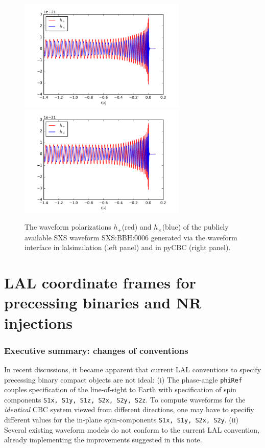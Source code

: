 \documentclass[11pt,tightenlines,article,amssymb,amsmath,amsfonts,superscriptaddress]{revtex4}
\begin{document}
\begin{figure}
\begin{center}
\includegraphics[width=80mm]{lalsim_SXS6.pdf}
\includegraphics[width=80mm]{pycbc_SXS6.pdf}
\caption{The waveform polarizations $h_+$(red) and $h_\times$(blue) of the publicly available SXS waveform SXS:BBH:0006
generated via the waveform interface in lalsimulation (left panel) and in pyCBC (right panel). }
\label{fig:waveforms}
\end{center}
\end{figure}

\section{LAL coordinate frames for precessing binaries and NR injections}
\label{sec:coordinates}

\subsubsection{Executive summary: changes of conventions}

In recent discussions, it became apparent that current LAL conventions
to specify precessing binary compact objects are not ideal: (i) The
phase-angle {\tt phiRef} couples specification of the line-of-sight to
Earth with specification of spin components {\tt S1x, S1y, S1z, S2x,
  S2y, S2z}.  To compute waveforms for the \emph{identical} CBC system
viewed from different directions, one may have to specifiy different
values for the in-plane spin-components {\tt S1x, S1y, S2x, S2y}.
(ii) Several existing waveform models do not conform to the current
LAL convention, already implementing the improvements suggested in this note.
\end{document}
